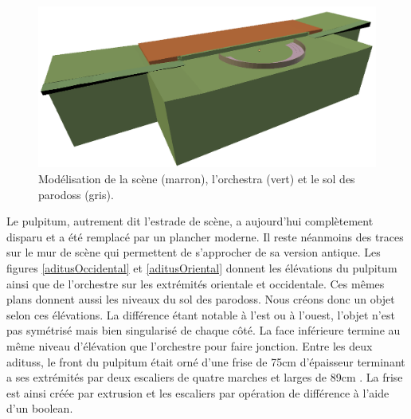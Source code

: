 \begin{figure}[!h] \centering
	\includegraphics[width=\linewidth]{images/modOrchestre}
	\caption[Modélisation de la scène, l'\gls{orchestra} et le sol des \glspl{parodos}]{Modélisation de la scène (marron), l'\gls{orchestra} (vert) et le sol des \glspl{parodos} (gris).} 
	\label{modOrchestre} 
\end{figure} 

Le \gls{pulpitum}, autrement dit l'estrade de scène, a aujourd'hui complètement disparu et a été remplacé par un plancher moderne. Il reste néanmoins des traces sur le mur de scène qui permettent de s'approcher de sa version antique. Les figures \ref{aditusOccidental} et \ref{aditusOriental} donnent les élévations du pulpitum ainsi que de l'orchestre sur les extrémités orientale et occidentale. Ces mêmes plans donnent aussi les niveaux du sol des \glspl{parodos}. Nous créons donc un objet selon ces élévations. La différence étant notable à l'est ou à l'ouest, l'objet n'est pas symétrisé mais bien singularisé de chaque côté. La face inférieure termine au même niveau d'élévation que l'orchestre pour faire jonction. Entre les deux \glspl{aditus}, le front du \gls{pulpitum} était orné d'une frise de 75cm d'épaisseur terminant a ses extrémités par deux escaliers de quatre marches et larges de 89cm \cite[p. 458]{formigeBis}. La frise est ainsi créée par extrusion et les escaliers par opération de différence à l'aide d'un \gls{boolean}.

